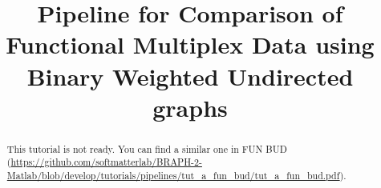 \documentclass[justified]{tufte-handout}
\title{Pipeline for Comparison of Functional Multiplex Data using Binary Weighted Undirected graphs}
\begin{document}
\maketitle

\begin{abstract}
\noindent
This tutorial is not ready. You can find a similar one in FUN BUD (\url{https://github.com/softmatterlab/BRAPH-2-Matlab/blob/develop/tutorials/pipelines/tut_a_fun_bud/tut_a_fun_bud.pdf}).
\end{abstract}
\end{document}
